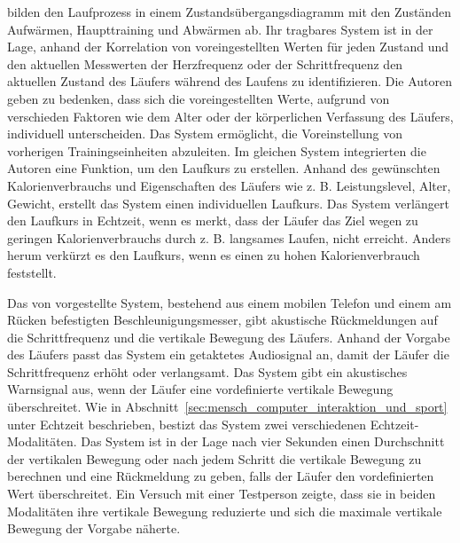 \citet[][]{Takata2007} bilden den Laufprozess in einem Zustandsübergangsdiagramm mit den Zuständen Aufwärmen, Haupttraining und Abwärmen ab. Ihr tragbares System ist in der Lage, anhand der Korrelation von voreingestellten Werten für jeden Zustand und den aktuellen Messwerten der Herzfrequenz oder der Schrittfrequenz den aktuellen Zustand des Läufers während des Laufens zu identifizieren. Die Autoren geben zu bedenken, dass sich die voreingestellten Werte, aufgrund von verschieden Faktoren wie dem Alter oder der körperlichen Verfassung des Läufers, individuell unterscheiden. Das System ermöglicht, die Voreinstellung von vorherigen Trainingseinheiten abzuleiten. Im gleichen System integrierten die Autoren eine Funktion, um den Laufkurs zu erstellen. Anhand des gewünschten Kalorienverbrauchs und Eigenschaften des Läufers wie z. B. Leistungslevel, Alter, Gewicht, erstellt das System einen individuellen Laufkurs. Das System verlängert den Laufkurs in Echtzeit, wenn es merkt, dass der Läufer das Ziel wegen zu geringen Kalorienverbrauchs durch z. B. langsames Laufen, nicht erreicht. Anders herum verkürzt es den Laufkurs, wenn es einen zu hohen Kalorienverbrauch feststellt.

Das von \citet[][]{Eriksson2010} vorgestellte System, bestehend aus einem mobilen Telefon und einem am Rücken befestigten Beschleunigungsmesser, gibt akustische Rückmeldungen auf die Schrittfrequenz und die vertikale Bewegung des Läufers. Anhand der Vorgabe des Läufers passt das System ein getaktetes Audiosignal an, damit der Läufer die Schrittfrequenz erhöht oder verlangsamt. Das System gibt ein akustisches Warnsignal aus, wenn der Läufer eine vordefinierte vertikale Bewegung überschreitet. Wie in Abschnitt~\ref{sec:mensch_computer_interaktion_und_sport} unter Echtzeit beschrieben, bestizt das System zwei verschiedenen Echtzeit-Modalitäten. Das System ist in der Lage nach vier Sekunden einen Durchschnitt der vertikalen Bewegung oder nach jedem Schritt die vertikale Bewegung zu berechnen und eine Rückmeldung zu geben, falls der Läufer den vordefinierten Wert überschreitet. Ein Versuch mit einer Testperson zeigte, dass sie in beiden Modalitäten ihre vertikale Bewegung reduzierte und sich die maximale vertikale Bewegung der Vorgabe näherte.

